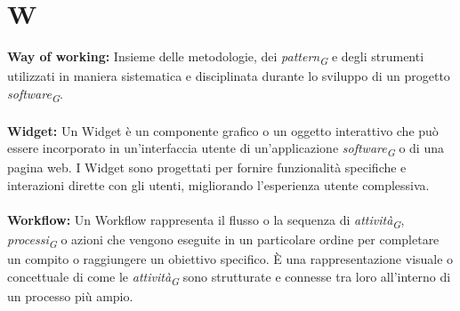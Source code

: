 \documentclass{article}
\begin{document}
\section*{W}
{}
\textbf{Way of working:} Insieme delle metodologie, dei \textit{pattern}\textsubscript{\textit{G}} e degli strumenti utilizzati in maniera sistematica e disciplinata durante lo sviluppo di un progetto \textit{software}\textsubscript{\textit{G}}.
\\
\\
\textbf{Widget:} Un Widget è un componente grafico o un oggetto interattivo che può essere incorporato in un'interfaccia utente di un'applicazione \textit{software}\textsubscript{\textit{G}} o di una pagina web. I Widget sono progettati per fornire funzionalità specifiche e interazioni dirette con gli utenti, migliorando l'esperienza utente complessiva.
\\
\\
\textbf{Workflow:} Un Workflow rappresenta il flusso o la sequenza di \textit{attività}\textsubscript{\textit{G}}, \textit{processi}\textsubscript{\textit{G}} o azioni che vengono eseguite in un particolare ordine per completare un compito o raggiungere un obiettivo specifico. È una rappresentazione visuale o concettuale di come le \textit{attività}\textsubscript{\textit{G}} sono strutturate e connesse tra loro all'interno di un processo più ampio.
\end{document}
